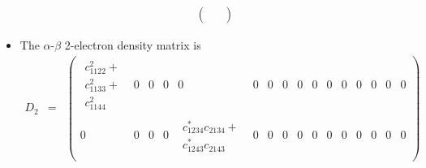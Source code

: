 \documentclass{amsart}
\begin{document}
\begin{itemize}
\begin{eqnarray}
\begin{pmatrix}
\begin{array}{l}
         \end{array} \\
         \end{pmatrix}
         \end{eqnarray}
\item The $\alpha$-$\beta$ 2-electron density matrix is
         \begin{eqnarray}
         D_2 &=&
         \begin{pmatrix}
         \begin{array}{l}
         c_{1122}^2+ \\
         c_{1133}^2+ \\
         c_{1144}^2
         \end{array} &
         0 & 0 & 0 &
         0 & 0 & 0 & 0 &
         0 & 0 & 0 & 0 &
         0 & 0 & 0 & 0 \\
         0 & 0 & 0 & 0 &
         \begin{array}{l}
         c_{1234}^*c_{2134}+ \\
         c_{1243}^*c_{2143}
         \end{array} &
         0 & 0 & 0 &
         0 & 0 & 0 & 0 &
         0 & 0 & 0 & 0 \\
         \end{pmatrix}
         \end{eqnarray}
\end{itemize}
\end{document}

